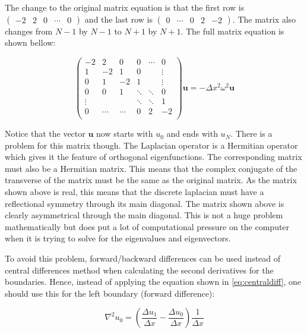 The change to the original matrix equation is that the first row is $\begin{pmatrix}-2&2&0&\cdots&0\end{pmatrix}$ and the last row is $\begin{pmatrix}0&\cdots&0&2&-2\end{pmatrix}$. The matrix also changes from $N-1$ by $N-1$ to $N+1$ by $N+1$. The full matrix equation is shown bellow:

\begin{equation}
\begin{pmatrix}
    -2    &     2&     0&     0&\cdots&      0\\
    1     &    -2&     1&     0&      & \vdots\\
    0     &     1&    -2&     1&      & \vdots\\
    0     &     0&     1&\ddots&\ddots&      0\\
    \vdots&      &      &\ddots&\ddots&      1\\
    0     &\cdots&\cdots&     0&     2&     -2\\
\end{pmatrix}
\mathbf{u} = -\Delta x^2 \omega^2 \mathbf{u}
\end{equation}

Notice that the vector $\mathbf{u}$ now starts with $u_0$ and ends with $u_N$. There is a problem for this matrix though. The Laplacian operator is a Hermitian operator which gives it the feature of orthogonal eigenfunctions. The corresponding matrix must also be a Hermitian matrix. This means that the complex conjugate of the transverse of the matrix must be the same as the original matrix. As the matrix shown above is real, this means that the discrete laplacian must have a reflectional symmetry through its main diagonal. The matrix shown above is clearly asymmetrical through the main diagonal. This is not a huge problem mathematically but does put a lot of computational pressure on the computer when it is trying to solve for the eigenvalues and eigenvectors.

To avoid this problem, forward/backward differences can be used instead of central differences method when calculating the second derivatives for the boundaries. Hence, instead of applying the equation shown in \eqref{eq:centraldiff}, one should use this for the left boundary (forward difference): 

\begin{equation}
    \nabla^2 u_0 = (\frac{\Delta u_1}{\Delta x} - \frac{\Delta u_0}{\Delta x})\frac{1}{\Delta x}
\end{equation}

